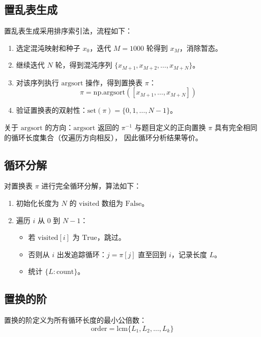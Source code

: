 \documentclass[12pt,a4paper]{ctexrep}
\begin{document}
\subsection{置乱表生成}

置乱表生成采用排序索引法，流程如下：

\begin{enumerate}
  \item 选定混沌映射和种子 $x_0$，迭代 $M=1000$ 轮得到 $x_M$，消除暂态。
  \item 继续迭代 $N$ 轮，得到混沌序列 $\{x_{M+1}, x_{M+2}, \ldots, x_{M+N}\}$。
  \item 对该序列执行 $\text{argsort}$ 操作，得到置换表 $\pi$：
  \begin{equation}
    \pi = \text{np.argsort}([x_{M+1}, \ldots, x_{M+N}])
  \end{equation}
  \item 验证置换表的双射性：$\text{set}(\pi) = \{0, 1, \ldots, N-1\}$。
\end{enumerate}

关于 $\text{argsort}$ 的方向：$\text{argsort}$ 返回的 $\pi^{-1}$
与题目定义的正向置换 $\pi$ 具有完全相同的循环长度集合（仅遍历方向相反），
因此循环分析结果等价。

\subsection{循环分解}

对置换表 $\pi$ 进行完全循环分解，算法如下：

\begin{enumerate}
  \item 初始化长度为 $N$ 的 $\text{visited}$ 数组为 $\text{False}$。
  \item 遍历 $i$ 从 $0$ 到 $N-1$：
    \begin{itemize}
      \item 若 $\text{visited}[i]$ 为 $\text{True}$，跳过。
      \item 否则从 $i$ 出发追踪循环：$j = \pi[j]$ 直至回到 $i$，记录长度 $L$。
      \item 统计 $\{L: \text{count}\}$。
    \end{itemize}
\end{enumerate}

\subsection{置换的阶}

置换的阶定义为所有循环长度的最小公倍数：
\begin{equation}
  \text{order} = \text{lcm}\{L_1, L_2, \ldots, L_k\}
\end{equation}
\end{document}
